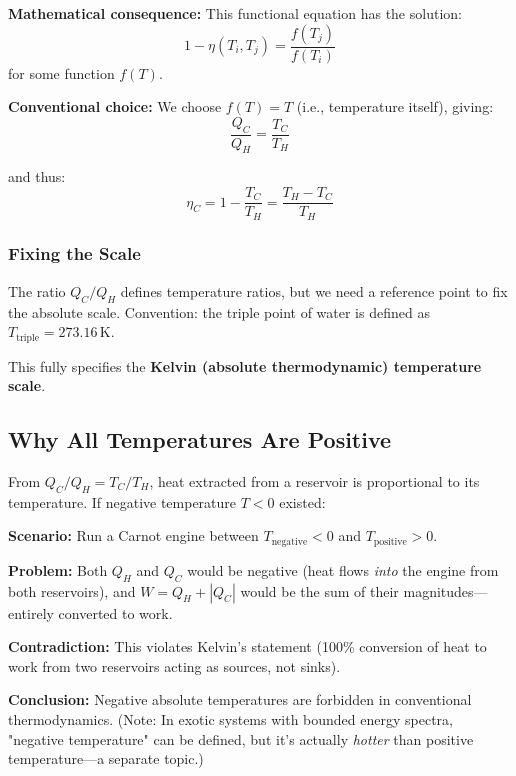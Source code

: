\documentclass[9pt,twocoloumn]{article}
\begin{document}
\textbf{Mathematical consequence:} This functional equation has the solution:
\begin{equation}
1 - \eta(T_i, T_j) = \frac{f(T_j)}{f(T_i)}
\end{equation}
for some function $f(T)$.

\textbf{Conventional choice:} We choose $f(T) = T$ (i.e., temperature itself), giving:
\begin{equation}
\boxed{\frac{Q_C}{Q_H} = \frac{T_C}{T_H}}
\end{equation}

and thus:
\begin{equation}
\boxed{\eta_C = 1 - \frac{T_C}{T_H} = \frac{T_H - T_C}{T_H}}
\end{equation}

\subsubsection{Fixing the Scale}
The ratio $Q_C/Q_H$ defines temperature ratios, but we need a reference point to fix the absolute scale. Convention: the triple point of water is defined as $T_{\text{triple}} = 273.16 \, \text{K}$.

This fully specifies the \textbf{Kelvin (absolute thermodynamic) temperature scale}.

\subsection{Why All Temperatures Are Positive}

From $Q_C/Q_H = T_C/T_H$, heat extracted from a reservoir is proportional to its temperature. If negative temperature $T < 0$ existed:

\textbf{Scenario:} Run a Carnot engine between $T_{\text{negative}} < 0$ and $T_{\text{positive}} > 0$.

\textbf{Problem:} Both $Q_H$ and $Q_C$ would be negative (heat flows \emph{into} the engine from both reservoirs), and $W = Q_H + |Q_C|$ would be the sum of their magnitudes—entirely converted to work.

\textbf{Contradiction:} This violates Kelvin's statement (100\% conversion of heat to work from two reservoirs acting as sources, not sinks).

\textbf{Conclusion:} Negative absolute temperatures are forbidden in conventional thermodynamics. (Note: In exotic systems with bounded energy spectra, "negative temperature" can be defined, but it's actually \emph{hotter} than positive temperature—a separate topic.)
\end{document}
